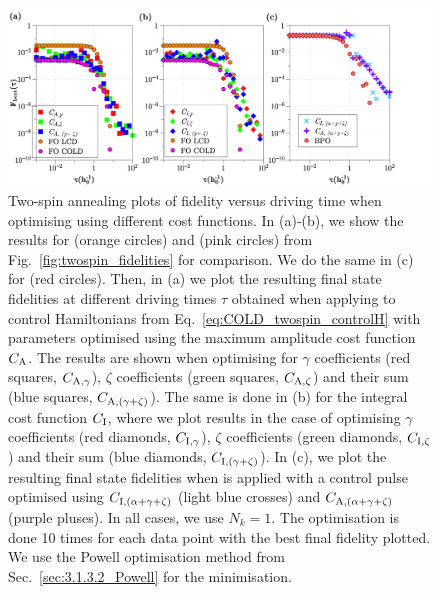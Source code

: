 \begin{figure}[t]
    \centering
    \includegraphics[width=\linewidth]{images_v1/twospin_HO_scatter.png} \caption[Two-spin annealing plots of fidelity versus driving time when minimising different orders of LCD.]{Two-spin annealing plots of fidelity versus driving time when optimising using different cost functions. In (a)-(b), we show the results for   (orange circles) and   (pink circles) from Fig.~\ref{fig:twospin_fidelities} for comparison. We do the same in (c) for  (red circles). Then, in (a) we plot the resulting final state fidelities at different driving times $\tau$ obtained when applying   to control Hamiltonians from Eq.~\eqref{eq:COLD_twospin_controlH} with parameters optimised using the maximum amplitude cost function $C_{\rm A}$. The results are shown when optimising for $\gamma$ coefficients (red squares, $C_{\rm A, \gamma}$), $\zeta$ coefficients (green squares, $C_{\rm A, \zeta}$) and their sum (blue squares, $C_{\rm A, (\gamma + \zeta)}$). The same is done in (b) for the integral cost function $C_{\rm I}$, where we plot results in the case of optimising $\gamma$ coefficients (red diamonds, $C_{\rm I, \gamma}$), $\zeta$ coefficients (green diamonds, $C_{\rm I, \zeta}$) and their sum (blue diamonds, $C_{\rm I, (\gamma + \zeta)}$). In (c), we plot the resulting final state fidelities when  is applied with a control pulse optimised using $C_{\rm I, (\alpha + \gamma + \zeta)}$ (light blue crosses) and $C_{\rm A, (\alpha + \gamma + \zeta)}$ (purple pluses). In all cases, we use $N_k = 1$. The optimisation is done 10 times for each data point with the best final fidelity plotted. We use the Powell optimisation method from Sec.~\ref{sec:3.1.3.2_Powell} for the minimisation.}\label{fig:twospin_scatter}
\end{figure}


